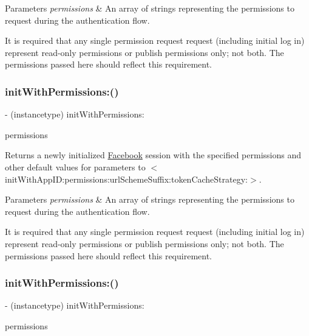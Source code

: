 \begin{DoxyParams}{Parameters}
{\em permissions} & An array of strings representing the permissions to request during the authentication flow.\\
\hline
\end{DoxyParams}
It is required that any single permission request request (including initial log in) represent read-\/only permissions or publish permissions only; not both. The permissions passed here should reflect this requirement. \mbox{\label{interfaceFBSession_a3f8419d590fb8f950aa9aee7110fb5e6}} 
\subsubsection{\texorpdfstring{init\+With\+Permissions\+:()}{initWithPermissions:()}\hspace{0.1cm}{\footnotesize\ttfamily [3/5]}}
{\footnotesize\ttfamily -\/ (instancetype) init\+With\+Permissions\+: \begin{DoxyParamCaption}\item[{(N\+S\+Array $\ast$)}]{permissions }\end{DoxyParamCaption}}

Returns a newly initialized \hyperlink{interfaceFacebook}{Facebook} session with the specified permissions and other default values for parameters to $<$init\+With\+App\+I\+D\+:permissions\+:url\+Scheme\+Suffix\+:token\+Cache\+Strategy\+:$>$.


\begin{DoxyParams}{Parameters}
{\em permissions} & An array of strings representing the permissions to request during the authentication flow.\\
\hline
\end{DoxyParams}
It is required that any single permission request request (including initial log in) represent read-\/only permissions or publish permissions only; not both. The permissions passed here should reflect this requirement. \mbox{\label{interfaceFBSession_a3f8419d590fb8f950aa9aee7110fb5e6}} 
\subsubsection{\texorpdfstring{init\+With\+Permissions\+:()}{initWithPermissions:()}\hspace{0.1cm}{\footnotesize\ttfamily [4/5]}}
{\footnotesize\ttfamily -\/ (instancetype) init\+With\+Permissions\+: \begin{DoxyParamCaption}\item[{(N\+S\+Array $\ast$)}]{permissions }\end{DoxyParamCaption}}

